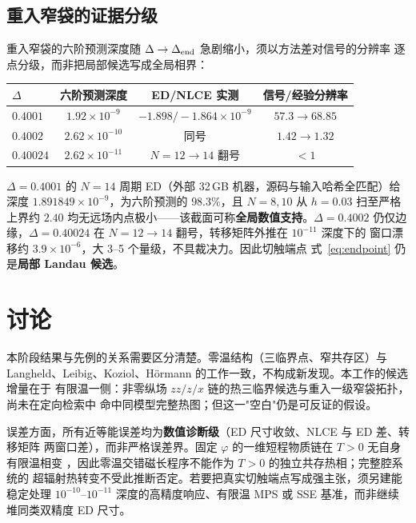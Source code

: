 \documentclass[UTF8,11pt,a4paper]{ctexart}
\begin{document}
\subsection{重入窄袋的证据分级}

重入窄袋的六阶预测深度随 $\Delta\to\Delta_{\rm end}$ 急剧缩小，须以方法差对信号的分辨率
逐点分级，而非把局部候选写成全局相界：

\begin{center}
\begin{tabular}{lccc}
\toprule
$\Delta$ & 六阶预测深度 & ED/NLCE 实测 & 信号/经验分辨率 \\
\midrule
$0.4001$ & $1.92\times10^{-9}$ & $-1.898/-1.864\times10^{-9}$ & $57.3\to68.85$ \\
$0.4002$ & $2.62\times10^{-10}$ & 同号 & $1.42\to1.32$ \\
$0.40024$ & $2.62\times10^{-11}$ & $N=12\to14$ 翻号 & $<1$ \\
\bottomrule
\end{tabular}
\end{center}

$\Delta=0.4001$ 的 $N=14$ 周期 ED（外部 32\,GB 机器，源码与输入哈希全匹配）给深度
$1.891849\times10^{-9}$，为六阶预测的 $98.3\%$，且 $N=8,10$ 从 $h=0.03$ 扫至严格
上界约 $2.40$ 均无远场内点极小——该截面可称\textbf{全局数值支持}。$\Delta=0.4002$
仍仅边缘，$\Delta=0.40024$ 在 $N=12\to14$ 翻号，转移矩阵外推在 $10^{-11}$ 深度下的
窗口漂移约 $3.9\times10^{-6}$，大 3--5 个量级，不具裁决力。因此切触端点
式~\eqref{eq:endpoint} 仍是\textbf{局部 Landau 候选}。

\section{讨论}

本阶段结果与先例的关系需要区分清楚。零温结构（三临界点、窄共存区）与
Langheld、Leibig、Koziol、Hörmann 的工作一致\cite{Langheld2025Wormhole,Leibig2026SelfConsistent,
Koziol2026Criticality,Hormann2026Folds}，不构成新发现。本工作的候选增量在于
有限温一侧：非零纵场 $zz/z/x$ 链的热三临界候选与重入一级窄袋拓扑，尚未在定向检索中
命中同模型完整热图；但这一"空白"仍是可反证的假设。

误差方面，所有近等能误差均为\textbf{数值诊断级}（ED 尺寸收敛、NLCE 与 ED 差、转移矩阵
两窗口差），而非严格误差界。固定 $\varphi$ 的一维短程物质链在 $T>0$ 无自身有限温相变
\cite{Araki1969Gibbs}，因此零温交错磁长程序不能作为 $T>0$ 的独立共存热相；完整腔系统的
超辐射热转变不受此推断否定。若要把真实切触端点写成强主张，须另建能稳定处理
$10^{-10}$--$10^{-11}$ 深度的高精度响应、有限温 MPS 或 SSE 基准，而非继续堆同类双精度
ED 尺寸。
\end{document}
